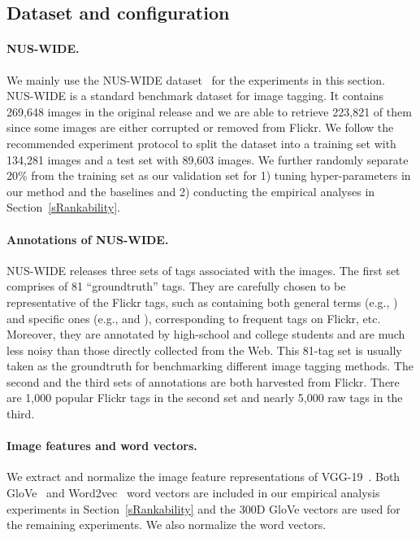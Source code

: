 \documentclass[10pt,twocolumn,letterpaper]{article}
\begin{document}
\subsection{Dataset and configuration}
\paragraph{NUS-WIDE.}
We mainly use the NUS-WIDE dataset~\cite{chua_nus-wide:_2009} for the experiments in this section. NUS-WIDE is a standard benchmark dataset for image tagging. It contains 269,648 images in the original release and we are able to retrieve 223,821 of them since some images are either corrupted or removed from Flickr. We follow the recommended experiment protocol to split the dataset into a training set with 134,281 images and a test set with 89,603 images. We further randomly separate 20\% from the training set as our validation set for 1) tuning hyper-parameters in our method and the baselines  and 2) conducting the empirical analyses in Section~\ref{sRankability}. 
\vspace{-12pt}

\paragraph{Annotations of NUS-WIDE.}
NUS-WIDE releases three sets of tags associated with  the images. The first set comprises of 81 ``groundtruth'' tags. They are carefully chosen to be representative of the Flickr tags, such as containing both general terms (e.g., ) and specific ones (e.g.,  and ), corresponding to frequent tags on Flickr, etc. Moreover, they are annotated by high-school and college students and are much less noisy than those directly collected from the Web. This 81-tag set is usually taken as the groundtruth for benchmarking different image tagging methods. The second and the third sets of annotations are both harvested from Flickr. There are 1,000 popular Flickr tags in the second set and nearly 5,000 raw tags in the third. 
\vspace{-25pt}






\paragraph{Image features and word vectors.}
We extract and  normalize the image feature representations of VGG-19~\cite{simonyan_very_2014}. Both GloVe~\cite{pennington_glove:_2014} and Word2vec~\cite{mikolov_linguistic_2013} word vectors are included in our empirical analysis experiments in Section~\ref{sRankability} and the 300D GloVe vectors are used for the remaining experiments. We also  normalize the word vectors. 
\vspace{-12pt}
\end{document}
